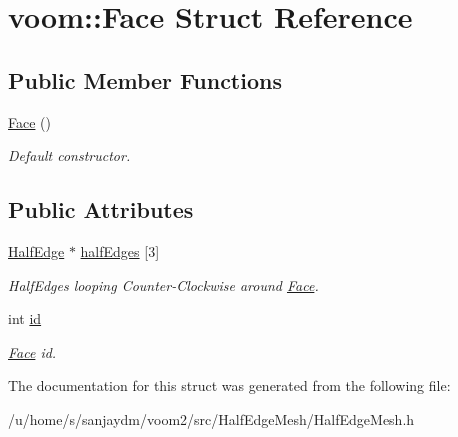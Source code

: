 \hypertarget{structvoom_1_1_face}{
\section{voom::Face Struct Reference}
\label{structvoom_1_1_face}
}
\subsection*{Public Member Functions}
\begin{DoxyCompactItemize}
\item 
\hypertarget{structvoom_1_1_face_a38d92b0ac285cd9d9321e9056eee217b}{
\hyperlink{structvoom_1_1_face_a38d92b0ac285cd9d9321e9056eee217b}{Face} ()}
\label{structvoom_1_1_face_a38d92b0ac285cd9d9321e9056eee217b}

\begin{DoxyCompactList}\small\item\em Default constructor. \item\end{DoxyCompactList}\end{DoxyCompactItemize}
\subsection*{Public Attributes}
\begin{DoxyCompactItemize}
\item 
\hypertarget{structvoom_1_1_face_aca39f730f5a2e8eb1b606e729d84b67d}{
\hyperlink{structvoom_1_1_half_edge}{HalfEdge} $\ast$ \hyperlink{structvoom_1_1_face_aca39f730f5a2e8eb1b606e729d84b67d}{halfEdges} \mbox{[}3\mbox{]}}
\label{structvoom_1_1_face_aca39f730f5a2e8eb1b606e729d84b67d}

\begin{DoxyCompactList}\small\item\em HalfEdges looping Counter-\/Clockwise around \hyperlink{structvoom_1_1_face}{Face}. \item\end{DoxyCompactList}\item 
\hypertarget{structvoom_1_1_face_a50c9056ea3ce92114a39bc01cfe5bbbb}{
int \hyperlink{structvoom_1_1_face_a50c9056ea3ce92114a39bc01cfe5bbbb}{id}}
\label{structvoom_1_1_face_a50c9056ea3ce92114a39bc01cfe5bbbb}

\begin{DoxyCompactList}\small\item\em \hyperlink{structvoom_1_1_face}{Face} id. \item\end{DoxyCompactList}\end{DoxyCompactItemize}


The documentation for this struct was generated from the following file:\begin{DoxyCompactItemize}
\item 
/u/home/s/sanjaydm/voom2/src/HalfEdgeMesh/HalfEdgeMesh.h\end{DoxyCompactItemize}
